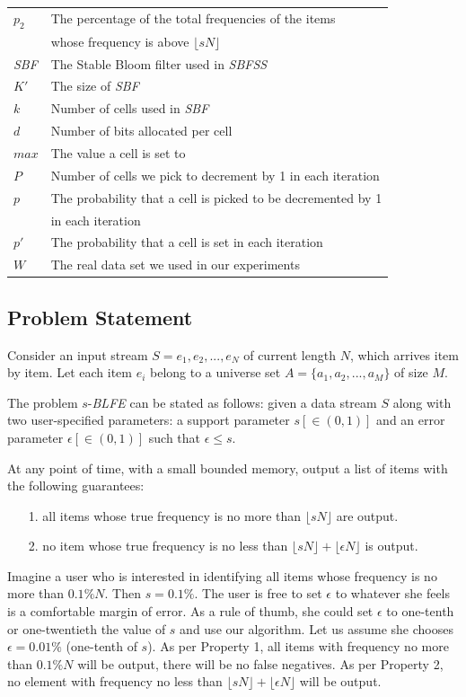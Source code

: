\documentclass[conference]{IEEEtran}
\begin{document}
\begin{table}
\begin{tabular}{ll}
		$p_2$ & The percentage of the total frequencies of the items \\&whose frequency is above $\lfloor sN\rfloor$\\
       \emph{SBF} &The Stable Bloom filter used in \emph{SBFSS}\\
        $K'$ & The size of \emph{SBF}\\
        $k$  &  Number of cells used in \emph{SBF}\\
        $d$  & Number of bits allocated per cell\\
        $max$ & The value a cell is set to\\
        $P$ &  Number of cells we pick to decrement by 1 in each iteration\\
        $p$ &  The probability that a cell is picked to be decremented by 1 \\
        &in each iteration\\
        $p'$ &  The probability that a cell is set in each iteration\\
        $W$ & The real data set we used in our experiments\\
       \hline
	\end{tabular}
\label{tab:list}

\end{table}

\subsection{Problem Statement}
Consider an input stream $S = e_1,e_2,..., e_N$ of current length $N$, which arrives item by item. Let each item $e_i$ belong to a universe set $A=\{a_1,a_2,...,a_M\}$ of size $M$.\par
The problem $s$-\emph{BLFE} can be stated as follows: given a data stream $S$ along with two user-specified parameters: a support parameter $s[\in (0,1)]$ and an error parameter $\epsilon[\in (0,1)]$ such that $\epsilon\leq s$.\par
At any point of time, with a small bounded memory, output a list of items with the following guarantees: 
\begin{enumerate}
\item[1.] all items whose true frequency is no more than $\lfloor sN\rfloor$ are output.
\item[2.] no item whose true frequency is no less than $\lfloor sN\rfloor+\lfloor\epsilon N\rfloor$ is output.
\end{enumerate}\par
Imagine a user who is interested in identifying all items whose frequency is no more than $0.1\%N$. Then $s=0.1\%$. The user is free to set $\epsilon$ to whatever she feels is a comfortable margin of error. As a rule of thumb, she could set $\epsilon$ to one-tenth or one-twentieth the value of $s$ and use our algorithm. Let us assume she chooses $\epsilon=0.01\%$ (one-tenth of $s$). As per Property 1, all items with frequency no more than  $0.1\%N$ will be output, there will be no false negatives. As per Property 2, no element with frequency no less than $\lfloor sN\rfloor+\lfloor\epsilon N\rfloor$ will be output.\par
\end{document}
